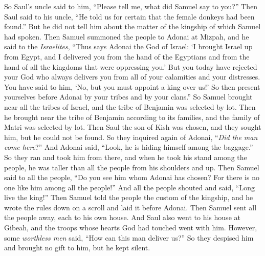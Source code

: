 \begin{biblechapter}
\verse So Saul’s uncle said to him, “Please tell me, what did Samuel say to you?”
\verse Then Saul said to his uncle, “He told us for certain that the female donkeys had been found.” But he did not tell him about the matter of the kingship of which Samuel had spoken.
\verse Then Samuel summoned the people to Adonai at Mizpah,
\verse and he said to the \textit{Israelites}, “Thus says Adonai the God of Israel: ‘I brought Israel up from Egypt, and I delivered you from the hand of the Egyptians and from the hand of all the kingdoms that were oppressing you.’
\verse But you today have rejected your God who always delivers you from all of your calamities and your distresses. You have said to him, ‘No, but you must appoint a king over us!’ So then present yourselves before Adonai by your tribes and by your clans.”
\verse So Samuel brought near all the tribes of Israel, and the tribe of Benjamin was selected by lot.
\verse Then he brought near the tribe of Benjamin according to its families, and the family of Matri was selected by lot. Then Saul the son of Kish was chosen, and they sought him, but he could not be found.
\verse So they inquired again of Adonai, “\textit{Did the man come here}?”  And Adonai said, “Look, he is hiding himself among the baggage.”
\verse So they ran and took him from there, and when he took his stand among the people, he was taller than all the people from his shoulders and up.
\verse Then Samuel said to all the people, “Do you see him whom Adonai has chosen? For there is no one like him among all the people!” And all the people shouted and said, “Long live the king!”
\verse Then Samuel told the people the custom of the kingship, and he wrote the rules down on a scroll and laid it before Adonai. Then Samuel sent all the people away, each to his own house.
\verse And Saul also went to his house at Gibeah, and the troops whose hearts God had touched went with him.
\verse However, some \textit{worthless men} said, “How can this man deliver us?” So they despised him and brought no gift to him, but he kept silent.
\end{biblechapter}

